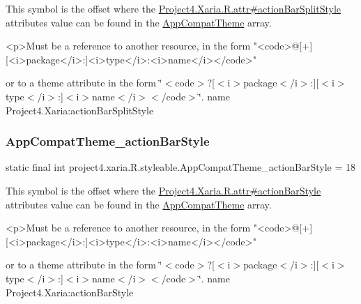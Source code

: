 This symbol is the offset where the \hyperlink{}{Project4.\+Xaria.\+R.\+attr\#action\+Bar\+Split\+Style} attribute\textquotesingle{}s value can be found in the \hyperlink{classproject4_1_1xaria_1_1R_1_1styleable_aad8bec413e2350f9404e6ff0e831a85d}{App\+Compat\+Theme} array.

\begin{DoxyVerb}      <p>Must be a reference to another resource, in the form "<code>@[+][<i>package</i>:]<i>type</i>:<i>name</i></code>"
\end{DoxyVerb}
 or to a theme attribute in the form \char`\"{}$<$code$>$?\mbox{[}$<$i$>$package$<$/i$>$\+:\mbox{]}\mbox{[}$<$i$>$type$<$/i$>$\+:\mbox{]}$<$i$>$name$<$/i$>$$<$/code$>$\char`\"{}.  name Project4.\+Xaria\+:action\+Bar\+Split\+Style \mbox{\label{classproject4_1_1xaria_1_1R_1_1styleable_abe5ffee6e83546a5c7599f052a12bdba}} 
\subsubsection{\texorpdfstring{App\+Compat\+Theme\+\_\+action\+Bar\+Style}{AppCompatTheme\_actionBarStyle}}
{\footnotesize\ttfamily static final int project4.\+xaria.\+R.\+styleable.\+App\+Compat\+Theme\+\_\+action\+Bar\+Style = 18\hspace{0.3cm}{\ttfamily [static]}}

This symbol is the offset where the \hyperlink{}{Project4.\+Xaria.\+R.\+attr\#action\+Bar\+Style} attribute\textquotesingle{}s value can be found in the \hyperlink{classproject4_1_1xaria_1_1R_1_1styleable_aad8bec413e2350f9404e6ff0e831a85d}{App\+Compat\+Theme} array.

\begin{DoxyVerb}      <p>Must be a reference to another resource, in the form "<code>@[+][<i>package</i>:]<i>type</i>:<i>name</i></code>"
\end{DoxyVerb}
 or to a theme attribute in the form \char`\"{}$<$code$>$?\mbox{[}$<$i$>$package$<$/i$>$\+:\mbox{]}\mbox{[}$<$i$>$type$<$/i$>$\+:\mbox{]}$<$i$>$name$<$/i$>$$<$/code$>$\char`\"{}.  name Project4.\+Xaria\+:action\+Bar\+Style \mbox{\label{classproject4_1_1xaria_1_1R_1_1styleable_a8061a97d3435cd3b90071e77b6a384d0}} 
